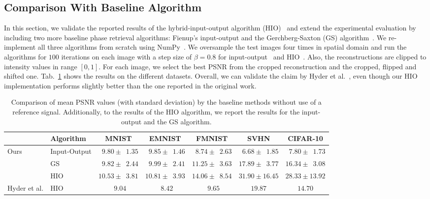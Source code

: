 \subsection{Comparison With Baseline Algorithm}

In this section, we validate the reported results of the hybrid-input-output algorithm (HIO)~\cite{Fienup:82} and extend the experimental evaluation by including two more baseline phase retrieval algorithms: Fienup's input-output and the Gerchberg-Saxton (GS) algorithm~\cite{Gerchberg1972APA}. We re-implement all three algorithms from scratch using NumPy~\cite{numpy}. We oversample the test images four times in spatial domain and run the algorithms for $100$ iterations on each image with a step size of $\beta=0.8$ for input-output~\cite{Fienup:82} and HIO~\cite{Fienup:82}. Also, the reconstructions are clipped to intensity values in range $[0, 1]$. For each image, we select the best PSNR from the cropped reconstruction and the cropped, flipped and shifted one. Tab.~\ref{results:baseline} shows the results on the different datasets. Overall, we can validate the claim by Hyder et al.~\cite{hyder2020solving}, even though our HIO~\cite{Fienup:82} implementation performs slightly better than the one reported in the original work.

\begin{table}
	\centering\tiny
	\begin{tabular}{llccccc}
		\toprule
		& Algorithm & MNIST& EMNIST& FMNIST & SVHN & CIFAR-10 \\
		\midrule

		\multirow{3}{*}{Ours} & Input-Output & $ \phantom{0}9.80\pm \phantom{0}1.35$ & $ \phantom{0}9.85\pm \phantom{0}1.46$ & $\phantom{0}8.74 \pm  \phantom{0}2.63$ & $\phantom{0}6.68 \pm \phantom{0}1.85$ & $\phantom{0}7.80 \pm \phantom{0}1.73$ \\

		& GS & $\phantom{0}9.82\pm \phantom{0}2.44$ & $ \phantom{0}9.99\pm \phantom{0}2.41$ & $11.25 \pm  \phantom{0}3.63$ & $17.89 \pm \phantom{0}3.77$ & $ 16.34\pm \phantom{0}3.08$ \\

		& HIO  & $10.53\pm \phantom{0}3.81 $& $10.81\pm \phantom{0}3.93$ & $14.06 \pm \phantom{0}8.54$ &  $31.90 \pm 16.45$ & $28.33 \pm 13.92$ \\
		\midrule
		\multirow{1}{*}{Hyder et al. \cite{hyder2020solving}} & HIO & $\phantom{0}9.04$ & $\phantom{0}8.42 $ & $\phantom{0}9.65$ & $19.87$ & $14.70$ \\
		\bottomrule
	\end{tabular}
	\caption{Comparison of mean PSNR values (with standard deviation) by the baseline methods without use of a reference signal. Additionally, to the results of the HIO algorithm, we report the results for the input-output and the GS algorithm.}
	\label{results:baseline}
\end{table}

